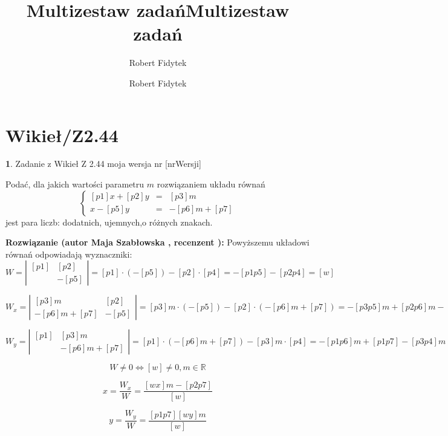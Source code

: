\documentclass[12pt, a4paper]{article}
\title{Multizestaw zadań}
\author{Robert Fidytek}
\date{}\documentclass[12pt, a4paper]{article}
\title{Multizestaw zadań}
\author{Robert Fidytek}
\date{}
\theoremstyle{definition} %
\newtheorem{zad}{}
\theoremstyle{definition} %
\newtheorem{zad}{}
\newcommand{\kategoria}[1]{\section{#1}} %
\newcommand{\zadStart}[1]{\begin{zad}#1\newline} %
\newcommand{\zadStop}{\end{zad}}   %
\newcommand{\rozwStart}[2]{\noindent \textbf{Rozwiązanie (autor #1 , recenzent #2): }\newline} %
\begin{document}
\maketitle


\kategoria{Wikieł/Z2.44}
\zadStart{Zadanie z Wikieł Z 2.44  moja wersja nr [nrWersji]}

Podać, dla jakich wartości parametru $m$ rozwiązaniem układu równań
$$\left\{\begin{array}{ccc}
[p1]x+[p2]y&=&[p3]m\\
[p4]x-[p5]y&=&-[p6]m+[p7]
\end{array} \right.$$
jest para liczb: dodatnich, ujemnych,o różnych znakach. 
\zadStop

\rozwStart{Maja Szabłowska}{}
Powyższemu układowi równań odpowiadają wyznaczniki:
$$W=\left| \begin{array}{lccr} [p1] & [p2] \\ [p4] & -[p5] \end{array}\right| = [p1]\cdot(-[p5]) - [p2]\cdot[p4]=-[p1p5]-[p2p4]=[w]$$

$$W_{x}=\left| \begin{array}{lccr} [p3]m & [p2] \\ -[p6]m+[p7] & -[p5] \end{array}\right| = [p3]m\cdot(-[p5]) - [p2]\cdot(-[p6]m+[p7])=-[p3p5]m+[p2p6]m-[p2p7]=[wx]m-[p2p7]$$

$$W_{y}=\left| \begin{array}{lccr} [p1] & [p3]m \\ [p4] & -[p6]m+[p7] \end{array}\right| = [p1]\cdot(-[p6]m+[p7]) - [p3]m\cdot[p4]=-[p1p6]m+[p1p7]-[p3p4]m=[p1p7][wy]m$$

$$W\neq 0 \iff [w] \neq 0, m\in\mathbb{R} $$

$$x=\frac{W_{x}}{W}=\frac{[wx]m-[p2p7]}{[w]}$$

$$y=\frac{W_{y}}{W}=\frac{[p1p7][wy]m}{[w]}$$
\end{document}
